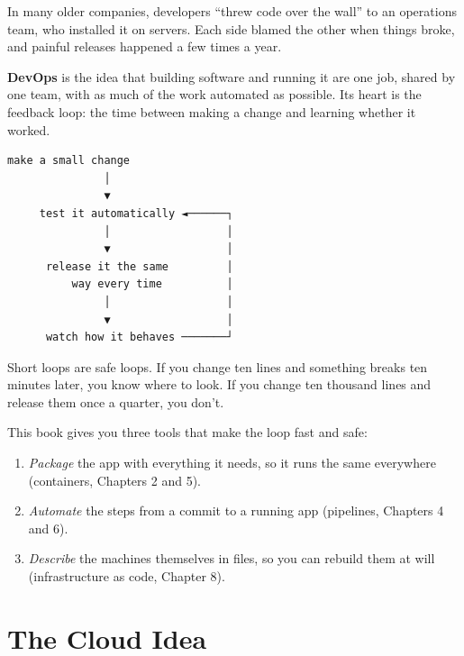 In many older companies, developers ``threw code over the wall'' to an operations team, who installed it on servers. Each side blamed the other when things broke, and painful releases happened a few times a year.

\textbf{DevOps} is the idea that building software and running it are one job, shared by one team, with as much of the work automated as possible. Its heart is the feedback loop: the time between making a change and learning whether it worked.

\begin{codeblock}
\begin{Verbatim}[breaklines=false, fontsize=\fontsize{8.8}{8.68}\selectfont, fontfamily=diagrammono, formatcom=\diagramlines]
        make a small change
               │
               ▼
     test it automatically ◄──────┐
               │                  │
               ▼                  │
      release it the same         │
          way every time          │
               │                  │
               ▼                  │
      watch how it behaves ───────┘
\end{Verbatim}
\end{codeblock}

Short loops are safe loops. If you change ten lines and something breaks ten minutes later, you know where to look. If you change ten thousand lines and release them once a quarter, you don't.

This book gives you three tools that make the loop fast and safe:

\begin{enumerate}
\def\labelenumi{\arabic{enumi}.}
\tightlist
\item
  \emph{Package} the app with everything it needs, so it runs the same everywhere (containers, Chapters 2 and 5).
\item
  \emph{Automate} the steps from a commit to a running app (pipelines, Chapters 4 and 6).
\item
  \emph{Describe} the machines themselves in files, so you can rebuild them at will (infrastructure as code, Chapter 8).
\end{enumerate}

\section{The Cloud Idea}\label{01-from-works-on-my-machine-to-works-for-everyone:the-cloud-idea}

